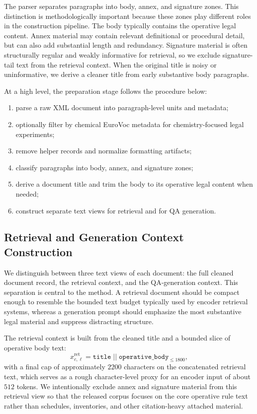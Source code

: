 The parser separates paragraphs into body, annex, and signature zones. This distinction is methodologically important because these zones play different roles in the construction pipeline. The body typically contains the operative legal content. Annex material may contain relevant definitional or procedural detail, but can also add substantial length and redundancy. Signature material is often structurally regular and weakly informative for retrieval, so we exclude signature-tail text from the retrieval context. When the original title is noisy or uninformative, we derive a cleaner title from early substantive body paragraphs.

At a high level, the preparation stage follows the procedure below:
\begin{enumerate}
\item parse a raw XML document into paragraph-level units and metadata;
\item optionally filter by chemical EuroVoc metadata for chemistry-focused legal experiments;
\item remove helper records and normalize formatting artifacts;
\item classify paragraphs into body, annex, and signature zones;
\item derive a document title and trim the body to its operative legal content when needed;
\item construct separate text views for retrieval and for QA generation.
\end{enumerate}

\subsection{Retrieval and Generation Context Construction}

We distinguish between three text views of each document: the full cleaned document record, the retrieval context, and the QA-generation context. This separation is central to the method. A retrieval document should be compact enough to resemble the bounded text budget typically used by encoder retrieval systems, whereas a generation prompt should emphasize the most substantive legal material and suppress distracting structure.

The retrieval context is built from the cleaned title and a bounded slice of operative body text:
\[
x^{\mathrm{ret}}_{c,\ell} =
\texttt{title}
\; || \;
\texttt{operative\_body}_{\leq 1800},
\]
with a final cap of approximately \(2200\) characters on the concatenated retrieval text, which serves as a rough character-level proxy for an encoder input of about \(512\) tokens. We intentionally exclude annex and signature material from this retrieval view so that the released corpus focuses on the core operative rule text rather than schedules, inventories, and other citation-heavy attached material.

